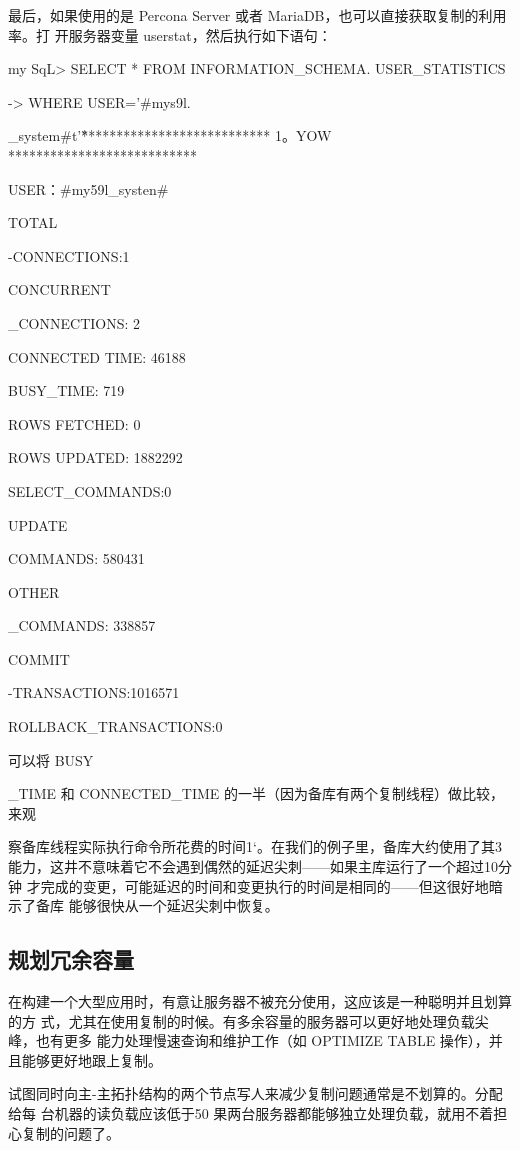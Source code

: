 最后，如果使用的是 Percona Server 或者 MariaDB，也可以直接获取复制的利用率。打
开服务器变量 userstat，然后执行如下语句：

my SqL> SELECT * FROM INFORMATION\_SCHEMA. USER\_STATISTICS

-> WHERE USER='#mys9l.

\_system#t'\G

*************************** 1。YOW ***************************

USER：#my59l\_systen#

TOTAL

-CONNECTIONS:1

CONCURRENT

\_CONNECTIONS: 2

CONNECTED TIME: 46188

BUSY\_TIME: 719

ROWS FETCHED: 0

ROWS UPDATED: 1882292

SELECT\_COMMANDS:0

UPDATE

COMMANDS: 580431

OTHER

\_COMMANDS: 338857

COMMIT

-TRANSACTIONS:1016571

ROLLBACK\_TRANSACTIONS:0

可以将 BUSY

\_TIME 和 CONNECTED\_TIME 的一半（因为备库有两个复制线程）做比较，来观

察备库线程实际执行命令所花费的时间1‘。在我们的例子里，备库大约使用了其3%
能力，这井不意味着它不会遇到偶然的延迟尖刺——如果主库运行了一个超过10分钟
才完成的变更，可能延迟的时间和变更执行的时间是相同的——但这很好地暗示了备库
能够很快从一个延迟尖刺中恢复。

\subsection{规划冗余容量}
在构建一个大型应用时，有意让服务器不被充分使用，这应该是一种聪明并且划算的方
式，尤其在使用复制的时候。有多余容量的服务器可以更好地处理负载尖峰，也有更多
能力处理慢速查询和维护工作（如 OPTIMIZE TABLE 操作），并且能够更好地跟上复制。

试图同时向主-主拓扑结构的两个节点写人来减少复制问题通常是不划算的。分配给每
台机器的读负载应该低于50%
果两台服务器都能够独立处理负载，就用不着担心复制的问题了。

